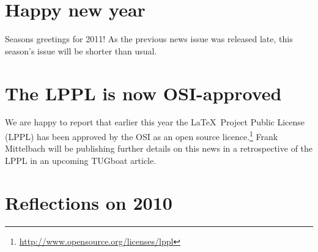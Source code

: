 \documentclass{ltnews}
\begin{document}
\maketitle


\section{Happy new year}

Seasons greetings for 2011!
As the previous news issue was released late, this season's issue will be shorter than usual.

\section{The LPPL is now OSI-approved}

We are happy to report that earlier this year the \LaTeX\ Project Public License (LPPL) has been approved by the OSI as an open source licence.\footnote{\url{http://www.opensource.org/licenses/lppl}} Frank Mittelbach will be publishing further details on this news in a retrospective of the LPPL in an upcoming TUGboat article.

\section{Reflections on 2010}
\end{document}
